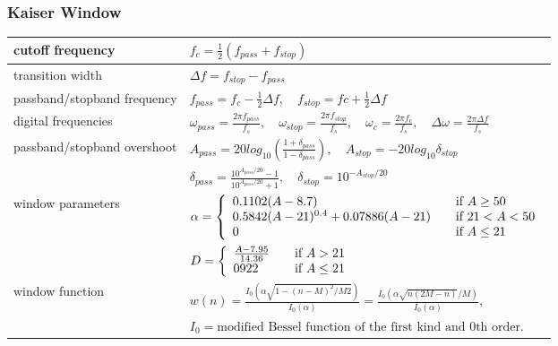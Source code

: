 \subsubsection{Kaiser Window}
\begin{tabular}{|l|l|}
	\hline
	cutoff frequency & $f_c=\frac{1}{2}(f_{pass}+f_{stop})$ \\ \hline
	transition width & $\Delta f = f_{stop}-f_{pass}$\\ \hline
	passband/stopband frequency & $f_{pass} = f_c - \frac{1}{2}\Delta f,\quad f_{stop}= fc+\frac{1}{2}\Delta f$\\ \hline
	digital frequencies & $\omega_{pass}=\frac{2\pi f_{pass}}{f_s},\quad \omega_{stop}=\frac{2\pi f_{stop}}{f_s},\quad
						  \omega_{c}=\frac{2\pi f_c}{f_s},\quad \Delta\omega=\frac{2\pi \Delta f}{f_s}$\\ \hline
	passband/stopband overshoot & $A_{pass}=20log_{10}\left(\frac{1+\delta_{pass}}{1-\delta_{pass}}\right),\quad A_{stop}=-20log_{10}\delta_{stop}$\\
								& $\delta_{pass}=\frac{10^{A_{pass}/20}-1}{10^{A_{pass}/20}+1},\quad \delta_{stop} = 10^{-A_{stop}/20}$ \\ \hline
	window parameters &
		$\alpha = \left\{
					\begin{array}{l l}
						0.1102(A-8.7)& \quad \text{if } A \geq 50\\
						0.5842(A-21)^{0.4}+0.07886(A-21) & \quad \text{if }21 < A < 50\\
						0 & \quad \text{if } A \leq 21
					\end{array} \right. $\\
	&	$D = \left\{
					\begin{array}{l l}
						\frac{A-7.95}{14.36}& \quad \text{if } A>21\\
						0922 & \quad \text{if } A \leq 21
					\end{array} \right. $\\ \hline
	window function & $w(n)=\frac{I_0(\alpha\sqrt{1-(n-M)^2/M2})}{I_0(\alpha)}=\frac{I_0(\alpha\sqrt{n(2M-n)}/M)}{I_0(\alpha)},$ \\
	& $I_0=\text{modified Bessel function of the first kind and 0th order.}$\\
	\hline						  
\end{tabular}

